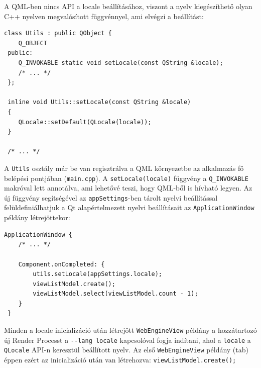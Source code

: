 \documentclass[12pt]{report}
\begin{document}
A QML-ben nincs API a locale beállításához, viszont a nyelv kiegészíthető olyan C++ nyelven
megvalósított függvénnyel, ami elvégzi a beállítást:
\begin{lstlisting}[title=utils.h]
 class Utils : public QObject {
    Q_OBJECT
 public:
    Q_INVOKABLE static void setLocale(const QString &locale);
    /* ... */
 };

 inline void Utils::setLocale(const QString &locale)
 {
    QLocale::setDefault(QLocale(locale));
 }

 /* ... */
\end{lstlisting}
A \texttt{Utils} osztály már be van regisztrálva a QML környezetbe az alkalmazás fő belépési
pontjában (\texttt{main.cpp}). A \texttt{setLocale(locale)} függvény a \texttt{Q\_INVOKABLE}
makróval lett annotálva, ami lehetővé teszi, hogy QML-ből is hívható legyen. Az új függvény
segítségével az \texttt{appSettings}-ben tárolt nyelvi beállítással felüldefiniálhatjuk a
Qt alapértelmezett nyelvi beállításait az \texttt{ApplicationWindow} példány létrejöttekor:
\begin{lstlisting}[title=main.qml]
 ApplicationWindow {
    /* ... */

    Component.onCompleted: {
        utils.setLocale(appSettings.locale);
        viewListModel.create();
        viewListModel.select(viewListModel.count - 1);
    }
 }
\end{lstlisting}
Minden a locale inicializáció után létrejött \texttt{WebEngineView} példány a hozzátartozó
új Render Processt a \texttt{-{}-lang locale} kapcsolóval fogja indítani, ahol a
\texttt{locale} a \texttt{QLocale} API-n keresztül beállított nyelv. Az első
\texttt{WebEngineView} példány (tab) éppen ezért az inicializáció után van létrehozva:
\texttt{viewListModel.create();}
\end{document}
